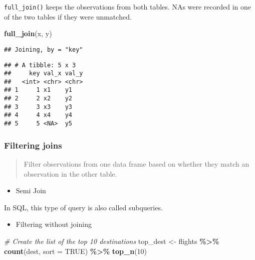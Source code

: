 \documentclass[
]{book}
\newenvironment{Shaded}{\begin{snugshade}}{\end{snugshade}}
\newcommand{\CommentTok}[1]{\textcolor[rgb]{0.56,0.35,0.01}{\textit{#1}}}
\newcommand{\DataTypeTok}[1]{\textcolor[rgb]{0.13,0.29,0.53}{#1}}
\newcommand{\DecValTok}[1]{\textcolor[rgb]{0.00,0.00,0.81}{#1}}
\newcommand{\KeywordTok}[1]{\textcolor[rgb]{0.13,0.29,0.53}{\textbf{#1}}}
\newcommand{\NormalTok}[1]{#1}
\newcommand{\OperatorTok}[1]{\textcolor[rgb]{0.81,0.36,0.00}{\textbf{#1}}}
\newcommand{\OtherTok}[1]{\textcolor[rgb]{0.56,0.35,0.01}{#1}}
\newcommand{\StringTok}[1]{\textcolor[rgb]{0.31,0.60,0.02}{#1}}
\providecommand{\tightlist}{%
  \setlength{\itemsep}{0pt}\setlength{\parskip}{0pt}}
\begin{document}
\texttt{full\_join()} keeps the observations from both tables. NAs were recorded in one of the two tables if they were unmatched.

\begin{Shaded}
\begin{Highlighting}[]
\KeywordTok{full\_join}\NormalTok{(x, y)}
\end{Highlighting}
\end{Shaded}

\begin{verbatim}
## Joining, by = "key"
\end{verbatim}

\begin{verbatim}
## # A tibble: 5 x 3
##     key val_x val_y
##   <int> <chr> <chr>
## 1     1 x1    y1   
## 2     2 x2    y2   
## 3     3 x3    y3   
## 4     4 x4    y4   
## 5     5 <NA>  y5
\end{verbatim}

\hypertarget{filtering-joins}{%
\subsubsection{Filtering joins}\label{filtering-joins}}

\begin{quote}
Filter observations from one data frame based on whether they match an observation in the other table.
\end{quote}

\begin{itemize}
\tightlist
\item
  Semi Join
\end{itemize}

In SQL, this type of query is also called subqueries.

\begin{itemize}
\tightlist
\item
  Filtering without joining
\end{itemize}

\begin{Shaded}
\begin{Highlighting}[]
\CommentTok{\# Create the list of the top 10 destinations}
\NormalTok{top\_dest \textless{}{-}}\StringTok{ }\NormalTok{flights }\OperatorTok{\%\textgreater{}\%}
\StringTok{  }\KeywordTok{count}\NormalTok{(dest, }\DataTypeTok{sort =} \OtherTok{TRUE}\NormalTok{) }\OperatorTok{\%\textgreater{}\%}
\StringTok{  }\KeywordTok{top\_n}\NormalTok{(}\DecValTok{10}\NormalTok{)}
\end{Highlighting}
\end{Shaded}
\end{document}
